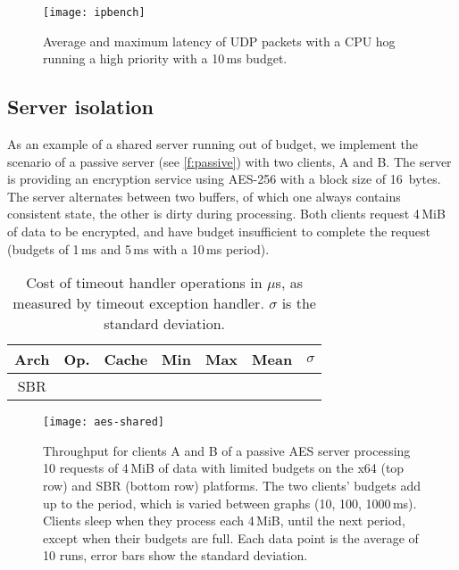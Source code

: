 \begin{figure}[b]
  \centering
  \texttt{[image: ipbench]}
  \caption{Average and maximum latency of UDP packets with a CPU hog running a high priority with a 10\,ms budget.}
  \label{f:ipbench}
\end{figure}


\subsection{Server isolation} 

As an example of a shared server running out of budget, we implement
the scenario of a passive server (see \autoref{f:passive}) with two
clients, A and B. The server is providing an encryption service using AES-256
with a block size of 16~bytes. The server alternates between two
buffers, of which one always contains consistent state, the other is
dirty during processing. Both clients request 4\,MiB of data to be encrypted, and
have budget insufficient to complete the request (budgets of 1\,ms and
5\,ms with a 10\,ms period).

\begin{table}[t]\centering
\begin{tabular}{|c|l|l|r|r|r|r|}\hline
\textbf{Arch} & \textbf{Op.} & \textbf{Cache} & \textbf{Min} &
                          \textbf{Max} & \textbf{Mean} &
                          \multicolumn{1}{c|}{\boldmath \(\sigma\)} \\\hline
\multirow{8}{*}{SBR}  \hline
\multirow{8}{*}{x64}  \hline
\end{tabular}
\caption{Cost of timeout handler operations in \(\mu\)s, as measured
  by timeout exception handler. \(\sigma\) is the standard deviation.}
\label{t:rollback}
\end{table}

\begin{figure*}[t]
  \centering
  \texttt{[image: aes-shared]}
  \caption{Throughput for clients A and B of a passive AES server processing 10 requests of 4\,MiB of data with
      limited budgets on the x64 (top row) and SBR (bottom row) platforms. The two clients' budgets
      add up to the period, which is varied between graphs (10, 100, 1000\,ms). Clients sleep when
      they process each 4\,MiB, until the next period, except when their budgets are full. Each data point is the average of 10 runs, error bars show the standard deviation.}
  \label{f:aes}
\end{figure*}

